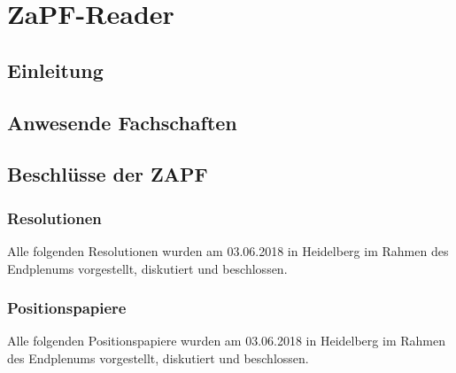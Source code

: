 \documentclass[ngerman, 11pt, openany]{scrbook}
\begin{document}
\dominitoc
\tableofcontents


\newpage
\setcounter{tocdepth}{1} %
\small\tableofcontents
\normalsize

\newpage
\part{ZaPF-Reader}

\chapter{Einleitung}
  

\chapter{Anwesende Fachschaften}
  

\chapter{Beschlüsse der ZAPF}
  \minitoc
  \section{Resolutionen}
    Alle folgenden Resolutionen wurden am 03.06.2018 in Heidelberg im Rahmen des Endplenums
    vorgestellt, diskutiert und beschlossen.

  \section{Positionspapiere}
    Alle folgenden Positionspapiere wurden am 03.06.2018 in Heidelberg im Rahmen des Endplenums
    vorgestellt, diskutiert und beschlossen.
\end{document}

